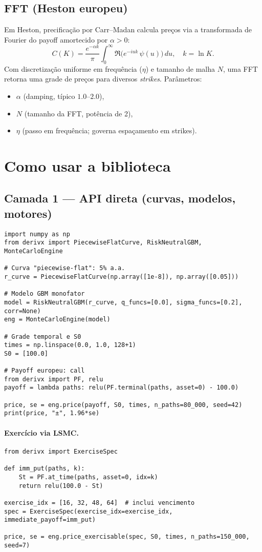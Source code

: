 \documentclass[11pt,a4paper]{article}
\begin{document}
\subsection{FFT (Heston europeu)}
Em Heston, precificação por Carr--Madan calcula preços via a transformada de Fourier do payoff amortecido por $\alpha>0$:
\[
C(K) = \frac{e^{-\alpha k}}{\pi}\int_0^\infty \Re\!\big( e^{-iu k}\,\psi(u)\big)\,du,\quad k=\ln K.
\]
Com discretização uniforme em frequência ($\eta$) e tamanho de malha $N$,
uma FFT retorna uma grade de preços para diversos \emph{strikes}. Parâmetros:
\begin{itemize}[nosep,leftmargin=1.2em]
\item $\alpha$ (damping, típico $1.0$--$2.0$), 
\item $N$ (tamanho da FFT, potência de 2),
\item $\eta$ (passo em frequência; governa espaçamento em strikes).
\end{itemize}

\section{Como usar a biblioteca}

\subsection{Camada 1 — API direta (curvas, modelos, motores)}
\begin{lstlisting}[style=pystyle]
import numpy as np
from derivx import PiecewiseFlatCurve, RiskNeutralGBM, MonteCarloEngine

# Curva "piecewise-flat": 5% a.a.
r_curve = PiecewiseFlatCurve(np.array([1e-8]), np.array([0.05]))

# Modelo GBM monofator
model = RiskNeutralGBM(r_curve, q_funcs=[0.0], sigma_funcs=[0.2], corr=None)
eng = MonteCarloEngine(model)

# Grade temporal e S0
times = np.linspace(0.0, 1.0, 128+1)
S0 = [100.0]

# Payoff europeu: call
from derivx import PF, relu
payoff = lambda paths: relu(PF.terminal(paths, asset=0) - 100.0)

price, se = eng.price(payoff, S0, times, n_paths=80_000, seed=42)
print(price, "±", 1.96*se)
\end{lstlisting}

\paragraph{Exercício via LSMC.}
\begin{lstlisting}[style=pystyle]
from derivx import ExerciseSpec

def imm_put(paths, k):
    St = PF.at_time(paths, asset=0, idx=k)
    return relu(100.0 - St)

exercise_idx = [16, 32, 48, 64]  # inclui vencimento
spec = ExerciseSpec(exercise_idx=exercise_idx, immediate_payoff=imm_put)

price, se = eng.price_exercisable(spec, S0, times, n_paths=150_000, seed=7)
\end{lstlisting}
\end{document}
